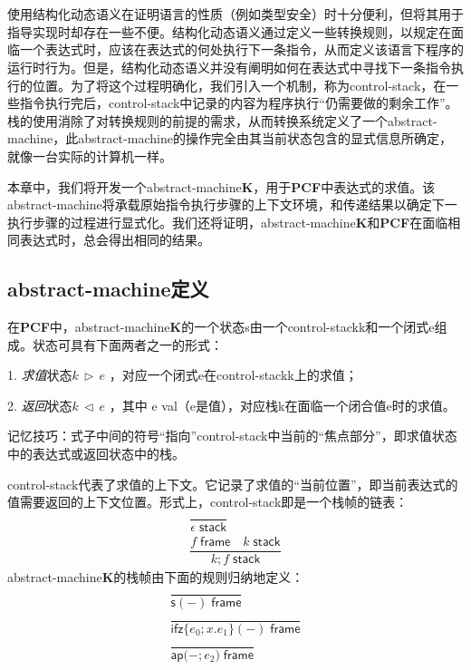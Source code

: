 \chapter{}

使用结构化动态语义在证明语言的性质（例如类型安全）时十分便利，但将其用于指导实现时却存在一些不便。结构化动态语义通过定义一些转换规则，以规定在面临一个表达式时，应该在表达式的何处执行下一条指令，从而定义该语言下程序的运行时行为。但是，结构化动态语义并没有阐明如何在表达式中寻找下一条指令执行的位置。为了将这个过程明确化，我们引入一个机制，称为\gls{control-stack}，在一些指令执行完后，\gls{control-stack}中记录的内容为程序执行“仍需要做的剩余工作”。栈的使用消除了对转换规则的前提的需求，从而转换系统定义了一个\gls{abstract-machine}，此\gls{abstract-machine}的操作完全由其当前状态包含的显式信息所确定，就像一台实际的计算机一样。

本章中，我们将开发一个\gls{abstract-machine}\textbf{K}，用于\textbf{PCF}中表达式的求值。该\gls{abstract-machine}将承载原始指令执行步骤的上下文环境，和传递结果以确定下一执行步骤的过程进行显式化。我们还将证明，\gls{abstract-machine}\textbf{K}和\textbf{PCF}在面临相同表达式时，总会得出相同的结果。

\section{\gls{abstract-machine}定义}
在\textbf{PCF}中，\gls{abstract-machine}\textbf{K}的一个状态s由一个\gls{control-stack}k和一个闭式e组成。状态可具有下面两者之一的形式：

1. \textit{求值}状态$k\,\triangleright\,e$ ，对应一个闭式e在\gls{control-stack}k上的求值；

2. \textit{返回}状态$k\,\triangleleft\,e$ ，其中 e val（e是值），对应栈k在面临一个闭合值e时的求值。

记忆技巧：式子中间的符号“指向”\gls{control-stack}中当前的“焦点部分”，即求值状态中的表达式或返回状态中的栈。

\gls{control-stack}代表了求值的上下文。它记录了求值的“当前位置”，即当前表达式的值需要返回的上下文位置。形式上，\gls{control-stack}即是一个栈帧的链表：
\begin{subequations}
    \begin{gather}
       \dfrac{}{\epsilon \; \mathsf{stack}}\\
       \dfrac{f \; \mathsf{frame} \quad k\;\mathsf{stack}}{k;f\;\mathsf{stack}}
    \end{gather}
\end{subequations}
\gls{abstract-machine}\textbf{K}的栈帧由下面的规则归纳地定义：
\begin{subequations}
    \begin{gather}
       \dfrac{}{\mathsf{s(-)} \; \mathsf{frame}}\\
       \dfrac{}{\mathsf{ifz} \{ e_0;x.e_1 \} \mathsf{(-)} \; \mathsf{frame}}\\
       \dfrac{}{\mathsf{ap(-;} e_2 \mathsf{)} \; \mathsf{frame}}
    \end{gather}
\end{subequations}

